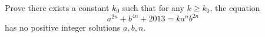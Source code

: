 Prove there exists a constant $k_0$ such that for any $k\ge k_0$, the equation
\[a^{2n}+b^{4n}+2013=ka^nb^{2n}\]
has no positive integer solutions $a,b,n$.

